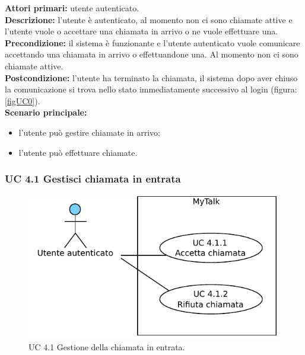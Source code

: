 \noindent
\textbf{Attori primari: }utente autenticato.\\
\textbf{Descrizione: }l'utente è autenticato, al momento non ci sono chiamate attive e l'utente vuole o accettare una chiamata in arrivo o ne vuole effettuare una.\\
\textbf{Precondizione: }il sistema è funzionante e l'utente autenticato vuole comunicare accettando una chiamata in arrivo o effettuandone una. Al momento non ci sono chiamate attive.\\
\textbf{Postcondizione: }l'utente ha terminato la chiamata, il sistema dopo aver chiuso la comunicazione si trova nello stato immediatamente successivo al login (figura: \ref{figUC0}).\\
\textbf{Scenario principale:}
\begin{itemize}
\item l'utente può gestire chiamate in arrivo;
\item l'utente può effettuare chiamate.
\end{itemize}

\subsubsection{UC 4.1 Gestisci chiamata in entrata}

\begin{figure}[htbp]
\centering
\includegraphics[scale=0.7]{./casi_uso/UC4-1.pdf}
\caption{UC 4.1 Gestione della chiamata in entrata.}
\end{figure}

